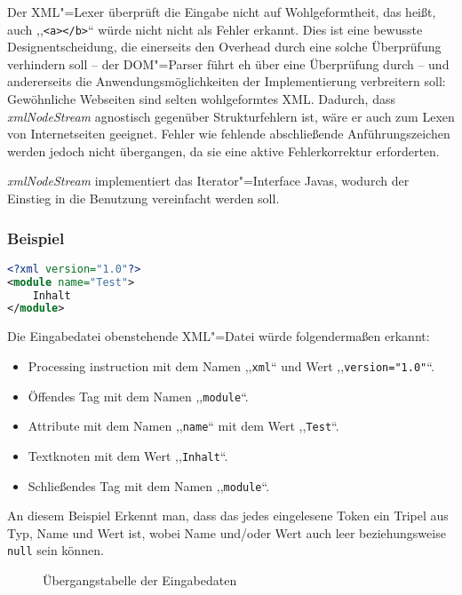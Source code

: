 \documentclass[10pt,a4paper,ngerman,titlepage,tocindentauto]{scrartcl}
\begin{document}
			Der XML"=Lexer überprüft die Eingabe nicht auf Wohlgeformtheit, das heißt, auch
			,,\verb|<a></b>|`` würde nicht nicht als Fehler erkannt. Dies ist eine bewusste Designentscheidung,
			die einerseits den Overhead durch eine solche Überprüfung verhindern soll -- der DOM"=Parser
			führt eh über eine Überprüfung durch -- und andererseits die Anwendungsmöglichkeiten der Implementierung
			verbreitern soll: Gewöhnliche Webseiten sind selten wohlgeformtes XML. Dadurch,
			dass {\em xmlNodeStream} agnostisch gegenüber Strukturfehlern ist, wäre er auch zum
			Lexen von Internetseiten geeignet. Fehler wie fehlende abschließende Anführungszeichen werden
			jedoch nicht übergangen, da sie eine aktive Fehlerkorrektur erforderten.
			
			{\em xmlNodeStream} implementiert das Iterator"=Interface Javas, wodurch der Einstieg in die
			Benutzung vereinfacht werden soll.
			
			\subsubsection*{Beispiel}
				\begin{lstlisting}[frame=single,language=XML,caption=Beispiel.xml]
<?xml version="1.0"?>
<module name="Test">
	Inhalt
</module>
				\end{lstlisting}
				Die Eingabedatei obenstehende XML"=Datei würde folgendermaßen erkannt:
				\begin{itemize}
					\item Processing instruction mit dem Namen ,,\verb|xml|`` und Wert ,,\verb|version="1.0"|``.
					\item Öffendes Tag mit dem Namen ,,\verb|module|``.
					\item Attribute mit dem Namen ,,\verb|name|`` mit dem Wert ,,\verb|Test|``.
					\item Textknoten mit dem Wert ,,\verb|Inhalt|``.
					\item Schließendes Tag mit dem Namen ,,\verb|module|``.
				\end{itemize}
				An diesem Beispiel Erkennt man, dass das jedes eingelesene Token ein Tripel aus
				Typ, Name und Wert ist, wobei Name und/oder Wert auch leer beziehungsweise \texttt{null} sein können.
			
			\begin{figure}[ht]
				\caption[Übergangstabelle der Eingabedaten]{\hypertarget{Uebergangsdiagramm_XML_Lexer}{Übergangstabelle der Eingabedaten}}
			\end{figure}
			
\end{document}
